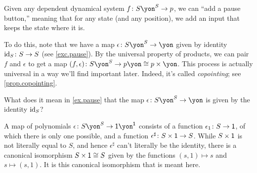 \documentclass[Book-Poly]{subfiles}
\begin{document}
\begin{example}\label{ex.pause}
Given any dependent dynamical system $f\colon S\yon^S\to p$, we can ``add a pause button,'' meaning that for any state (and any position), we add an input that keeps the state where it is.

To do this, note that we have a map $\epsilon\colon S\yon^S\to\yon$ given by identity $\mathrm{id}_S\colon S\to S$ (see \cref{exc.pause}). By the universal property of products, we can pair $f$ and $\epsilon$ to get a map $(f,\epsilon)\colon S\yon^S\to p\yon\cong p\times \yon$. This process is actually universal in a way we'll find important later. Indeed, it's called \emph{copointing}; see \cref{prop.copointing}.
\end{example}

\begin{exercise}\label{exc.pause}
What does it mean in \cref{ex.pause} that the map $\epsilon\colon S\yon^S\to\yon$ is given by the identity $\mathrm{id}_S$?
\begin{solution}
A map of polynomials $\epsilon\colon S\yon^S\to\1\yon^\1$ consists of a function $\epsilon_1\colon S\to\textsf{1}$, of which there is only one possible, and a function $\epsilon^\sharp\colon S\times\textsf{1}\to S$. While $S\times\textsf{1}$ is not literally equal to $S$, and hence $\epsilon^\sharp$ can't literally be the identity, there is a canonical isomorphism $S\times\textsf{1}\cong S$ given by the functions $(s,1)\mapsto s$ and $s\mapsto (s,1)$. It is this canonical isomorphism that is meant here.
\end{solution}
\end{exercise}
\end{document}
